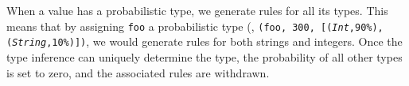 When a value has a probabilistic type, we generate rules for all its types.
This means that by assigning {\texttt{foo}} a probabilistic type 
(\eg, {\tt (\texttt{foo}, 300, [(\textsl{Int},90\%), 
(\textsl{String},10\%)])},
we would generate rules for both strings and integers.
Once the type inference can uniquely determine the type, 
the probability of all other types is set to zero, 
and the associated rules are withdrawn.

